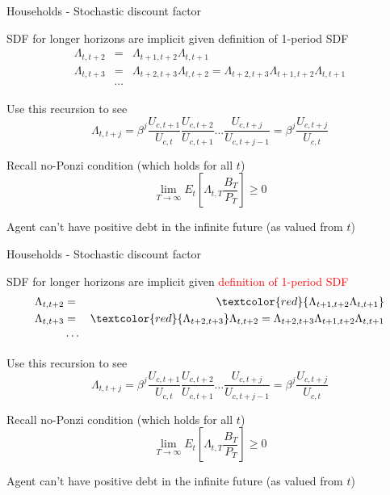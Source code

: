 \begin{frame}{Households - Stochastic discount factor}

SDF for longer horizons are implicit given definition of 1-period SDF
\begin{eqnarray*}
\Lambda_{t,t+2} &=& \Lambda_{t+1,t+2} \Lambda_{t,t+1} \\
\Lambda_{t,t+3} &=& \Lambda_{t+2,t+3} \Lambda_{t,t+2} = \Lambda_{t+2,t+3} \Lambda_{t+1,t+2}  \Lambda_{t,t+1} \\
&\cdots&
\end{eqnarray*}

Use this recursion to see
\[
\Lambda_{t,t+j} = \beta^{j} \frac{U_{c,t+1}}{U_{c,t}} \frac{U_{c,t+2}}{U_{c,t+1}} \ldots \frac{U_{c,t+j}}{U_{c,t+j-1}} = \beta^{j} \frac{U_{c,t+j}}{U_{c,t}}
\]

Recall no-Ponzi condition (which holds for all $t$)
\[
\lim_{T \to \infty} E_{t} \left[ \Lambda_{t,T} \frac{B_{T}}{P_{T}} \right] \geq 0
\]

Agent can't have positive debt in the infinite future (as valued from $t$)

\end{frame}



\begin{frame}{Households - Stochastic discount factor}

SDF for longer horizons are implicit given \textcolor{red}{definition of 1-period SDF}
\begin{eqnarray*}
\Lambda_{t,t+2} &=& \textcolor{red}{\Lambda_{t+1,t+2} \Lambda_{t,t+1}} \\
\Lambda_{t,t+3} &=& \textcolor{red}{\Lambda_{t+2,t+3}} \Lambda_{t,t+2} = \Lambda_{t+2,t+3} \Lambda_{t+1,t+2}  \Lambda_{t,t+1} \\
&\cdots&
\end{eqnarray*}

Use this recursion to see
\[
\Lambda_{t,t+j} = \beta^{j} \frac{U_{c,t+1}}{U_{c,t}} \frac{U_{c,t+2}}{U_{c,t+1}} \ldots \frac{U_{c,t+j}}{U_{c,t+j-1}} = \beta^{j} \frac{U_{c,t+j}}{U_{c,t}}
\]

Recall no-Ponzi condition (which holds for all $t$)
\[
\lim_{T \to \infty} E_{t} \left[ \Lambda_{t,T} \frac{B_{T}}{P_{T}} \right] \geq 0
\]

Agent can't have positive debt in the infinite future (as valued from $t$)

\end{frame}


